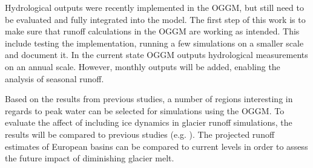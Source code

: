 \documentclass[12pt, a4paper]{article}
\begin{document}
Hydrological outputs were recently implemented in the OGGM, but still need to be
evaluated and fully integrated into the model. The first step of this work is to
make sure that runoff calculations in the OGGM are working as intended. This
include testing the implementation, running a few simulations on a smaller scale
and document it. In the current state OGGM outputs hydrological measurements on
an annual scale. However, monthly outputs will be added, enabling the analysis
of seasonal runoff.

Based on the results from previous studies, a number of regions interesting in
regards to peak water can be selected for simulations using the OGGM. To
evaluate the affect of including ice dynamics in glacier runoff simulations, the
results will be compared to previous studies (e.g.
\cite{rounceGlacierMassChange2020,hussGlobalscaleHydrologicalResponse2018}). The projected runoff estimates of European basins can be compared to current
levels in order to assess the future impact of diminishing glacier melt.

\printbibliography
\end{document}
